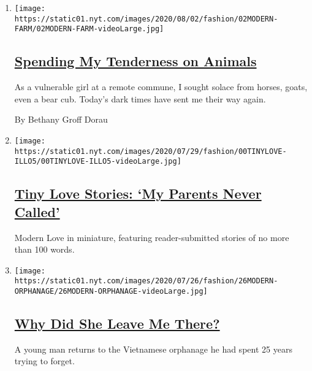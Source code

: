\begin{enumerate}
\def\labelenumi{\arabic{enumi}.}
\item
  \texttt{[image: https://static01.nyt.com/images/2020/08/02/fashion/02MODERN-FARM/02MODERN-FARM-videoLarge.jpg]}

  \hypertarget{spending-my-tenderness-on-animals}{%
  \subsection{\texorpdfstring{\href{/2020/07/31/style/modern-love-spending-tenderness-on-animals.html}{Spending
  My Tenderness on
  Animals}}{Spending My Tenderness on Animals}}\label{spending-my-tenderness-on-animals}}

  As a vulnerable girl at a remote commune, I sought solace from horses,
  goats, even a bear cub. Today's dark times have sent me their way
  again.

  By Bethany Groff Dorau
\item
  \texttt{[image: https://static01.nyt.com/images/2020/07/29/fashion/00TINYLOVE-ILLO5/00TINYLOVE-ILLO5-videoLarge.jpg]}

  \hypertarget{tiny-love-stories-my-parents-never-called}{%
  \subsection{\texorpdfstring{\href{/2020/07/28/style/tiny-modern-love-stories-coronavirus-my-parents-never-called.html}{Tiny
  Love Stories: `My Parents Never
  Called'}}{Tiny Love Stories: `My Parents Never Called'}}\label{tiny-love-stories-my-parents-never-called}}

  Modern Love in miniature, featuring reader-submitted stories of no
  more than 100 words.
\item
  \texttt{[image: https://static01.nyt.com/images/2020/07/26/fashion/26MODERN-ORPHANAGE/26MODERN-ORPHANAGE-videoLarge.jpg]}

  \hypertarget{why-did-she-leave-me-there-1}{%
  \subsection{\texorpdfstring{\href{/2020/07/24/style/modern-love-adoption-vietnam-why-did-she-leave-me-there.html}{Why
  Did She Leave Me
  There?}}{Why Did She Leave Me There?}}\label{why-did-she-leave-me-there-1}}

  A young man returns to the Vietnamese orphanage he had spent 25 years
  trying to forget.


\end{enumerate}
